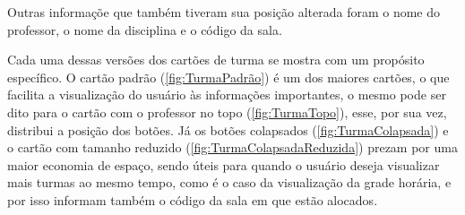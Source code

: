 Outras informaçõe que também tiveram sua posição alterada foram o nome do professor, o nome da disciplina e o código da sala.

Cada uma dessas versões dos cartões de turma se mostra com um propósito específico. O cartão padrão (\autoref{fig:TurmaPadrão}) é um dos maiores cartões, o que facilita a visualização do usuário às informações importantes, o mesmo pode ser dito para o cartão com o professor no topo (\autoref{fig:TurmaTopo}), esse, por sua vez, distribui a posição dos botões. Já os botões colapsados (\autoref{fig:TurmaColapsada}) e o cartão com tamanho reduzido (\autoref{fig:TurmaColapsadaReduzida}) prezam por uma maior economia de espaço, sendo úteis para quando o usuário deseja visualizar mais turmas ao mesmo tempo, como é o caso da visualização da grade horária, e por isso informam também o código da sala em que estão alocados.

